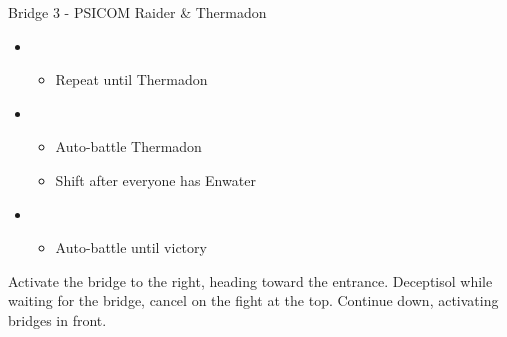 \begin{paracol}{2}
\begin{battle}{Bridge 3 - PSICOM Raider \& Thermadon}
\begin{itemize}
\begin{itemize}
				      \item Repeat Thermadon
			      \end{itemize}
			\item \fourth
			      \begin{itemize}
				      \item Repeat until Thermadon \stagger
			      \end{itemize}
			\item \first
			      \begin{itemize}
				      \item Auto-battle Thermadon
				      \item Shift after everyone has Enwater
			      \end{itemize}
			\item \fifth
			      \begin{itemize}
				      \item Auto-battle until victory
			      \end{itemize}
		\end{itemize}
		  
	\end{battle}

	Activate the bridge to the right, heading toward the entrance. Deceptisol while waiting for the bridge, cancel on the fight at the top. Continue down, activating bridges in front.


\end{paracol}
